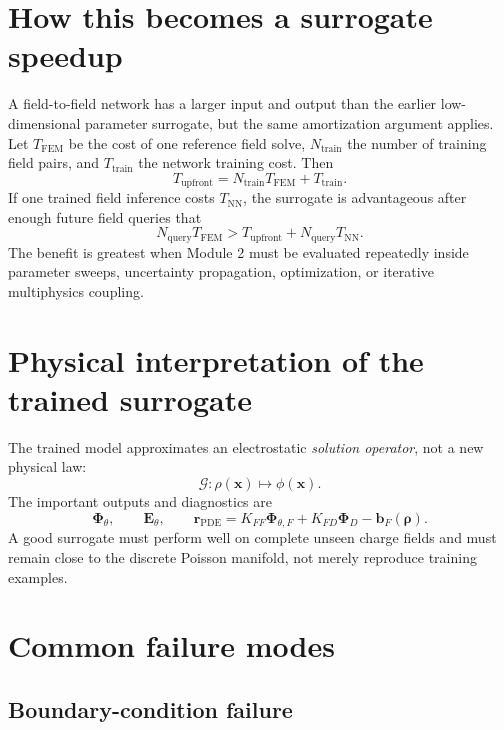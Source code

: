 \documentclass[11pt]{article}
\newcommand{\xv}{\bm{x}}
\newcommand{\Evec}{\mathbf{E}}
\begin{document}
\section{How this becomes a surrogate speedup}

A field-to-field network has a larger input and output than the earlier low-dimensional parameter surrogate, but the same amortization argument applies. Let $T_{\mathrm{FEM}}$ be the cost of one reference field solve, $N_{\mathrm{train}}$ the number of training field pairs, and $T_{\mathrm{train}}$ the network training cost. Then
\begin{equation}
T_{\mathrm{upfront}}=N_{\mathrm{train}}T_{\mathrm{FEM}}+T_{\mathrm{train}}.
\end{equation}
If one trained field inference costs $T_{\mathrm{NN}}$, the surrogate is advantageous after enough future field queries that
\begin{equation}
N_{\mathrm{query}}T_{\mathrm{FEM}}
>
T_{\mathrm{upfront}}+N_{\mathrm{query}}T_{\mathrm{NN}}.
\end{equation}
The benefit is greatest when Module 2 must be evaluated repeatedly inside parameter sweeps, uncertainty propagation, optimization, or iterative multiphysics coupling.

\section{Physical interpretation of the trained surrogate}

The trained model approximates an electrostatic \emph{solution operator}, not a new physical law:
\begin{equation}
\mathcal{G}:\rho(\xv)\mapsto\phi(\xv).
\end{equation}
The important outputs and diagnostics are
\begin{equation}
\bm{\Phi}_{\theta},\qquad
\Evec_{\theta},\qquad
\bm{r}_{\mathrm{PDE}}=K_{FF}\bm{\Phi}_{\theta,F}+K_{FD}\bm{\Phi}_D-\bm{b}_F(\bm{\rho}).
\end{equation}
A good surrogate must perform well on complete unseen charge fields and must remain close to the discrete Poisson manifold, not merely reproduce training examples.

\section{Common failure modes}

\subsection{Boundary-condition failure}
\end{document}
